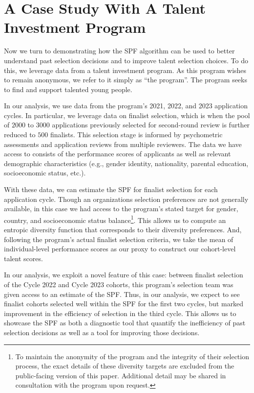 \section{A Case Study With A Talent Investment Program}\label{sec:case}

Now we turn to demonstrating how the SPF algorithm can be used to better understand past selection decisions and to improve talent selection choices. To do this, we leverage data from a talent investment program. As this program wishes to remain anonymous, we refer to it simply as ``the program''. The program seeks to find and support talented young people.

In our analysis, we use data from the program's 2021, 2022, and 2023 application cycles. In particular, we leverage data on finalist selection, which is when the pool of $2000$ to $3000$ applications previously selected for second-round review is further reduced to $500$ finalists. This selection stage is informed by psychometric assessments and application reviews from multiple reviewers. The data we have access to consists of the performance scores of applicants as well as relevant demographic characteristics (e.g., gender identity, nationality, parental education, socioeconomic status, etc.). 

With these data, we can estimate the SPF for finalist selection for each application cycle. Though an organizations selection preferences are not generally available, in this case we had
access to the program's stated target for gender, country, and socioeconomic status balance\footnote{To maintain the anonymity of the program and the integrity of their selection process, the exact details of these diversity targets are excluded from the public-facing version of this paper. Additional detail may be shared in consultation with the program upon request.}. This allows us to compute an entropic diversity function that corresponds to their diversity preferences. And, following the program's actual finalist selection criteria, we take the mean of individual-level performance scores as our proxy to construct our cohort-level talent scores. 

In our analysis, we exploit a novel feature of this case: between finalist selection of the Cycle 2022 and Cycle 2023 cohorts, this program's selection team was given access to an estimate of the SPF. Thus, in our analysis, we expect to see finalist cohorts selected well within the SPF for the first two cycles, but marked improvement in the efficiency of selection in the third cycle. This allows us to showcase the SPF as both a diagnostic tool that quantify the inefficiency of past selection decisions as well as a tool for improving those decisions. 


